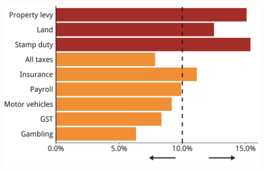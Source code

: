 \documentclass[tikz]{standalone}\usepackage[]{graphicx}\usepackage[]{color}
\newenvironment{knitrout}{}{} %
\begin{document}
\begin{knitrout}
\color{fgcolor}
\includegraphics[width=11.000in,height=7.00in]{./Property-taxes/atlas/figure/PROP-Figure3-flipped-1} 

\end{knitrout}
\end{document}
